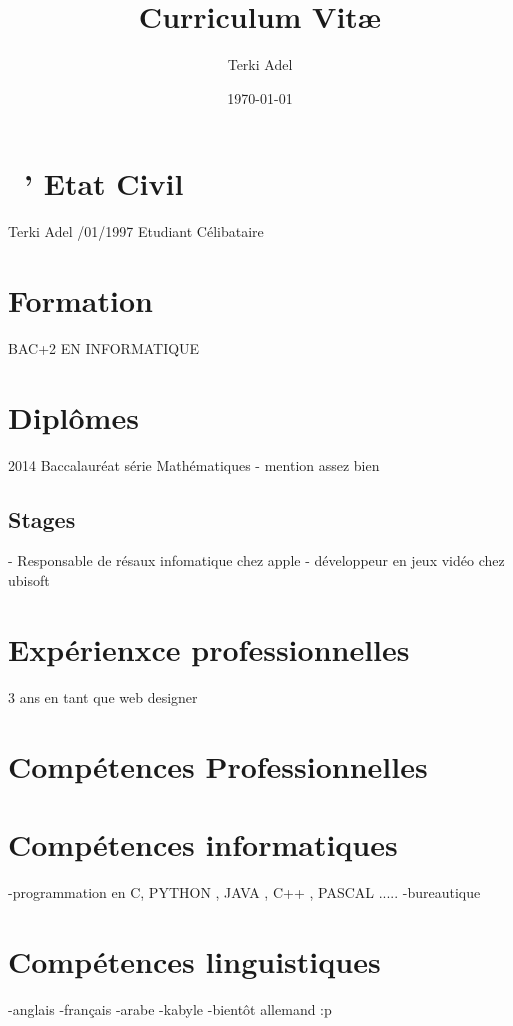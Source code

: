 \documentclass[a4paper]{article}
\title{Curriculum Vit\ae}
\author{Terki Adel}
\date{\today}
\begin{document}
\maketitle

\section{\ ' Etat Civil}
\noindent Terki 
Adel  /01/1997  \newline
Etudiant  \newline
Célibataire  \newline

\section{Formation}

BAC+2 EN INFORMATIQUE  \newline 


\section{Diplômes}

2014 Baccalauréat série Mathématiques - mention assez bien  \newline 

\subsection{Stages}

 - Responsable de résaux infomatique chez apple  - développeur en jeux vidéo chez ubisoft  \newline


\section{Expérienxce professionnelles}

3 ans en tant que web designer  \newline

\section{Compétences Professionnelles}


\section{Compétences informatiques}


\noindent -programmation en C, PYTHON , JAVA , C++ , PASCAL .....  \newline 
-bureautique  \newline

\section{Compétences linguistiques}

\noindent -anglais  \newline
-français  \newline
-arabe  \newline
-kabyle  \newline
-bientôt allemand :p  \newline 
\end{document}
